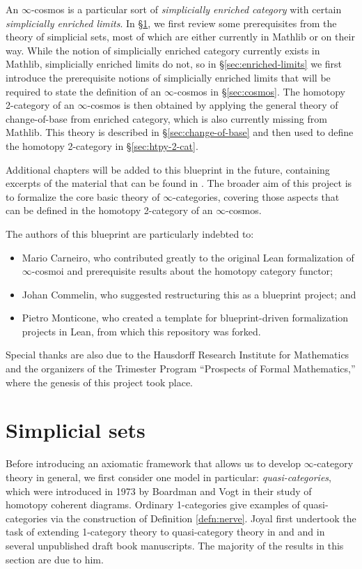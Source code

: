  An $\infty$-cosmos is a particular sort of \emph{simplicially enriched category} with certain \emph{simplicially enriched limits}. In \S\ref{sec:simplicial-sets}, we first review some prerequisites from the theory of simplicial sets, most of which are either currently in Mathlib or on their way. While the notion of simplicially enriched category currently exists in Mathlib, simplicially enriched limits do not, so in \S\ref{sec:enriched-limits} we first introduce the prerequisite notions of simplicially enriched limits that will be required to state the definition of an $\infty$-cosmos in \S\ref{sec:cosmos}. The homotopy 2-category of an $\infty$-cosmos is then obtained by applying the general theory of change-of-base from enriched category, which is also currently missing from Mathlib. This theory is described in \S\ref{sec:change-of-base} and then used to define the homotopy 2-category in \S\ref{sec:htpy-2-cat}.

  Additional chapters will be added to this blueprint in the future, containing excerpts of the material that can be found in \cite[Chapters 2-5]{RiehlVerity:2022eo}. The broader aim of this project is to formalize the core basic theory of $\infty$-categories, covering those aspects that can be defined in the homotopy 2-category of an $\infty$-cosmos.

 The authors of this blueprint are particularly indebted to:
 \begin{itemize}
 \item Mario Carneiro, who contributed greatly to the original Lean formalization of $\infty$-cosmoi and prerequisite results about the homotopy category functor;
 \item Johan Commelin, who suggested restructuring this as a blueprint project; and
 \item  Pietro Monticone, who created a template for blueprint-driven formalization projects in Lean, from which this repository was forked.
 \end{itemize}
 Special thanks are also due to the Hausdorff Research Institute for Mathematics and the organizers of the Trimester Program ``Prospects of Formal Mathematics,'' where the genesis of this project took place.

\section{Simplicial sets}\label{sec:simplicial-sets}

Before introducing an axiomatic framework that allows us to develop $\infty$-cat\-e\-gory theory in general, we first consider one model in particular:  \emph{quasi-cat\-e\-go\-ries}, which were introduced in 1973 by Boardman and Vogt  \cite{BoardmanVogt:1973hi} in their study of homotopy coherent diagrams. Ordinary 1-categories give examples of quasi-categories via the construction of Definition \ref{defn:nerve}. Joyal first undertook the task of extending 1-category theory to quasi-category theory in \cite{Joyal:2002qk} and \cite{Joyal:2008tq} and in several unpublished draft book manuscripts. The majority of the results in this section are due to him.


